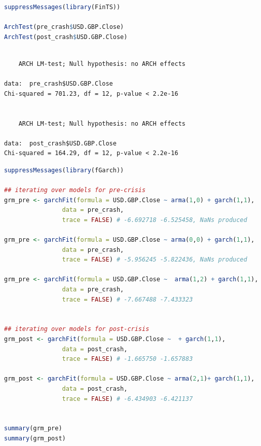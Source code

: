 \documentclass[a4paper]{article}
\begin{document}
\begin{lstlisting}[language=r,label=lst:org1129c17,caption={Question 4: ARCH test},captionpos=b,numbers=none]
suppressMessages(library(FinTS))

ArchTest(pre_crash$USD.GBP.Close)
ArchTest(post_crash$USD.GBP.Close)
\end{lstlisting}

\label{org322d1b8}
\begin{verbatim}

	ARCH LM-test; Null hypothesis: no ARCH effects

data:  pre_crash$USD.GBP.Close
Chi-squared = 701.23, df = 12, p-value < 2.2e-16


	ARCH LM-test; Null hypothesis: no ARCH effects

data:  post_crash$USD.GBP.Close
Chi-squared = 164.29, df = 12, p-value < 2.2e-16
\end{verbatim}

\begin{lstlisting}[language=r,label=lst:org7f2cef7,caption={Question 4: GARCH Model Fitting},captionpos=b,numbers=none]
suppressMessages(library(fGarch))

## iterating over models for pre-crisis
grm_pre <- garchFit(formula = USD.GBP.Close ~ arma(1,0) + garch(1,1),
                data = pre_crash,
                trace = FALSE) # -6.692718 -6.525458, NaNs produced

grm_pre <- garchFit(formula = USD.GBP.Close ~ arma(0,0) + garch(1,1),
                data = pre_crash,
                trace = FALSE) # -5.956245 -5.822436, NaNs produced

grm_pre <- garchFit(formula = USD.GBP.Close ~  arma(1,2) + garch(1,1),
                data = pre_crash,
                trace = FALSE) # -7.667488 -7.433323


## iterating over models for post-crisis
grm_post <- garchFit(formula = USD.GBP.Close ~  + garch(1,1),
                data = post_crash,
                trace = FALSE) # -1.665750 -1.657883

grm_post <- garchFit(formula = USD.GBP.Close ~ arma(2,1)+ garch(1,1),
                data = post_crash,
                trace = FALSE) # -6.434903 -6.421137


summary(grm_pre)
summary(grm_post)
\end{lstlisting}
\end{document}
